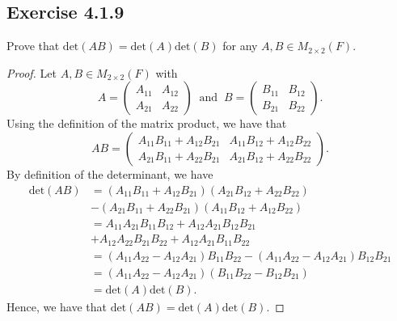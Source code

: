 \subsection*{Exercise 4.1.9} Prove that \( \text{det}(AB) = \text{det}(A) \text{det}(B) \) for any \( A,B \in {M}_{2 \times 2}(F) \).
\begin{proof}
Let \( A,B \in {M}_{2 \times 2}(F) \) with 
\[  A = \begin{pmatrix}
    {A}_{11} & {A}_{12} \\
    {A}_{21} & {A}_{22}
\end{pmatrix} \ \text{ and } \ B = \begin{pmatrix}
    {B}_{11} & {B}_{12} \\ 
    {B}_{21} & {B}_{22}
\end{pmatrix}. \]
Using the definition of the matrix product, we have that
\[  AB = \begin{pmatrix}
    {A}_{11}{B}_{11} + {A}_{12}{B}_{21} & {A}_{11} {B}_{12} + {A}_{12} {B}_{22} \\
    {A}_{21} {B}_{11} + {A}_{22} {B}_{21} & {A}_{21} {B}_{12} + {A}_{22} {B}_{22} 
\end{pmatrix}. \]
By definition of the determinant, we have
\begin{align*}
    \text{det}(AB) &= ({A}_{11}{B}_{11} + {A}_{12}{B}_{21})({A}_{21}{B}_{12} + {A}_{22} {B}_{22}) \\ 
                   &- ({A}_{21} {B}_{11} + {A}_{22} {B}_{21}) ({A}_{11} {B}_{12} + {A}_{12} {B}_{22}) \\
                   &=  {A}_{11}{A}_{21} {B}_{11}{B}_{12} + {A}_{12}{A}_{21}{B}_{12}{B}_{21} \\ &+ {A}_{12}{A}_{22}{B}_{21}{B}_{22} + {A}_{12}{A}_{21} {B}_{11} {B}_{22} \\
                   &= ({A}_{11}{A}_{22} - {A}_{12}{A}_{21}) {B}_{11}{B}_{22} - ({A}_{11}{A}_{22} - {A}_{12} {A}_{21}){B}_{12}{B}_{21} \\
                   &= ({A}_{11}{A}_{22} - {A}_{12} {A}_{21})({B}_{11}{B}_{22} - {B}_{12}{B}_{21}) \\
                   &= \text{det}(A) \text{det}(B).
\end{align*}
Hence, we have that \( \text{det}(AB) = \text{det}(A) \text{det}(B) \).
\end{proof}


